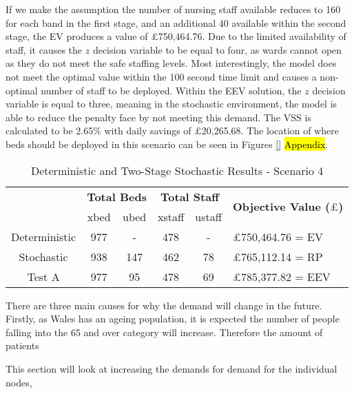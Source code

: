 \documentclass[../thesis.tex]{subfiles}
\begin{document}
If we make the assumption the number of nursing staff available reduces to 160 for each band in the first stage, and an additional 40 available within the second stage, the EV produces a value of $\pounds$750,464.76. Due to the limited availability of staff, it causes the $z$ decision variable to be equal to four, as wards cannot open as they do not meet the safe staffing levels. Most interestingly, the model does not meet the optimal value within the 100 second time limit and causes a non-optimal number of staff to be deployed. Within the EEV solution, the $z$ decision variable is equal to three, meaning in the stochastic environment, the model is able to reduce the penalty face by not meeting this demand. The VSS is calculated to be 2.65\% with daily savings of $\pounds$20,265.68. The location of where beds should be deployed in this scenario can be seen in Figures \ref{} \hl{Appendix}.

\begin{table}[h!]
    \centering
    \begin{tabular}{cccccl}\toprule
 & \multicolumn{2}{l}{\textbf{Total Beds}} & \multicolumn{2}{c}{\textbf{Total Staff}} & \multirow{2}{*}{\textbf{Objective Value ($\pounds$)}}\\ \cmidrule(lr){2-3} \cmidrule(lr){4-5}
         
 & xbed           & ubed          & xstaff         & ustaff         \\ \midrule
 Deterministic & 977 & - & 478 & - &$\pounds$750,464.76 = EV \\
 Stochastic & 938 & 147 & 462 & 78 & $\pounds$765,112.14 = RP \\
 Test A & 977 & 95 & 478 & 69 & $\pounds$785,377.82 = EEV \\\bottomrule
    \end{tabular}
    \caption{Deterministic and Two-Stage Stochastic Results - Scenario 4}
    \label{tab:Scenario4Results}
\end{table}



There are three main causes for why the demand will change in the future. Firstly, as Wales has an ageing population, it is expected the number of people falling into the 65 and over category will increase. Therefore the amount of patients 

This section will look at increasing the demands for demand for the individual nodes, 
\end{document}
